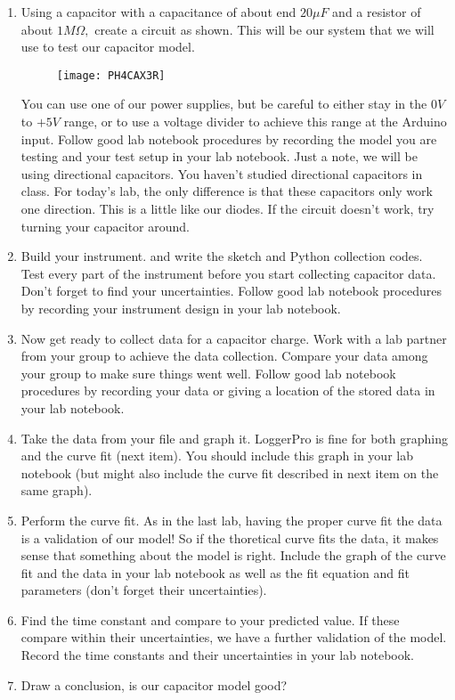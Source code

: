 \begin{enumerate}
	\item 
	
	Using a capacitor with a capacitance of about end $20\unit{\mu F}$ and a resistor of about $1\unit{M\Omega},$ create a circuit as shown. This will be our system that we will use to test our capacitor model.
	
	\begin{figure}[h!]
		\centering
		\texttt{[image: PH4CAX3R]}
	\end{figure}
	You can use one of our power supplies, but be careful to either stay in the $0\unit{V}$ to $+5\unit{V}$ range, or to use a voltage divider to achieve this range at the Arduino input. Follow good lab notebook procedures by recording the model you are testing and your test setup in your lab notebook. Just a note, we will be using directional capacitors. You haven't studied directional capacitors in class. For today's lab, the only difference is that these capacitors only work one direction. This is a little like our diodes. If the circuit doesn't work, try turning your capacitor around.

	\item Build your instrument. and write the sketch and Python collection codes. Test every part of the instrument before you start collecting capacitor data. Don't forget to find your uncertainties. Follow good lab notebook procedures by recording your instrument design in your lab notebook.

	\item Now get ready to collect data for a capacitor charge. Work with a lab partner from your group to achieve the data collection. Compare your data among your group to make sure things went well. Follow good lab notebook procedures by recording your data or giving a location of the stored data in your lab notebook. 
	
	\item Take the data from your file and graph it. LoggerPro is fine for both graphing and the curve fit (next item). You should include this graph in your lab notebook (but might also include the curve fit described in  next item on the same graph).

	\item Perform the curve fit. As in the last lab, having the proper curve fit the data is a validation of our model! So if the thoretical curve fits the data, it makes sense that something about the model is right. Include the graph of the curve fit and the data in your lab notebook as well as the fit equation and fit parameters (don't forget their uncertainties).

	\item Find the time constant and compare to your predicted value. If these compare within their uncertainties, we have a further validation of the model. Record the time constants and their uncertainties in your lab notebook.

	\item Draw a conclusion, is our capacitor model good?
\end{enumerate}


\vspace*{\fill}

